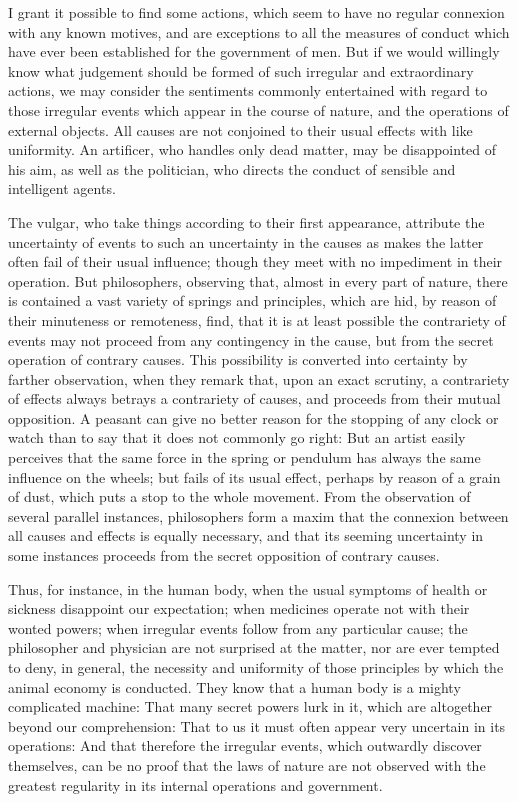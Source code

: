 \documentclass[]{article}
\begin{document}
\begin{sectionbody}
\humeparagraph  I grant it possible to find some actions, which seem to have no regular connexion with any known motives, and are exceptions to all the measures of conduct which have ever been established for the government of men. But if we would willingly know what judgement should be formed of such irregular and extraordinary actions, we may consider the sentiments commonly entertained with regard to those irregular events which appear in the course of nature, and the operations of external objects. All causes are not conjoined to their usual effects with like uniformity. An artificer, who handles only dead matter, may be disappointed of his aim, as well as the politician, who directs the conduct of sensible and intelligent agents.

\humeparagraph  The vulgar, who take things according to their first appearance, attribute the uncertainty of events to such an uncertainty in the causes as makes the latter often fail of their usual influence; though they meet with no impediment in their operation. But philosophers, observing that, almost in every part of nature, there is contained a vast variety of springs and principles, which are hid, by reason of their minuteness or remoteness, find, that it is at least possible the contrariety of events may not proceed from any contingency in the cause, but from the secret operation of contrary causes. This possibility is converted into certainty by farther observation, when they remark that, upon an exact scrutiny, a contrariety of effects always betrays a contrariety of causes, and proceeds from their mutual opposition. A peasant can give no better reason for the stopping of any clock or watch than to say that it does not commonly go right: But an artist easily perceives that the same force in the spring or pendulum has always the same influence on the wheels; but fails of its usual effect, perhaps by reason of a grain of dust, which puts a stop to the whole movement. From the observation of several parallel instances, philosophers form a maxim that the connexion between all causes and effects is equally necessary, and that its seeming uncertainty in some instances proceeds from the secret opposition of contrary causes.

\humeparagraph  Thus, for instance, in the human body, when the usual symptoms of health or sickness disappoint our expectation; when medicines operate not with their wonted powers; when irregular events follow from any particular cause; the philosopher and physician are not surprised at the matter, nor are ever tempted to deny, in general, the necessity and uniformity of those principles by which the animal economy is conducted. They know that a human body is a mighty complicated machine: That many secret powers lurk in it, which are altogether beyond our comprehension: That to us it must often appear very uncertain in its operations: And that therefore the irregular events, which outwardly discover themselves, can be no proof that the laws of nature are not observed with the greatest regularity in its internal operations and government.


\end{sectionbody}
\end{document}
